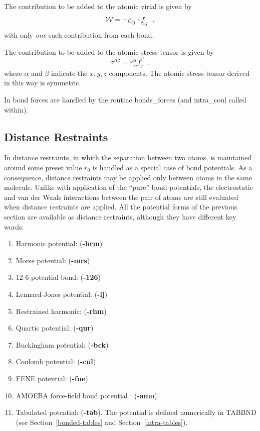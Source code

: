 The contribution to be added to the atomic virial is given by
\begin{equation}
{\cal W} = -\mbox{$\underline{r}$}_{ij} \cdot \mbox{$\underline{f}$}_{j}~~,
\end{equation}
with only {\em one} such contribution from each bond.

The contribution to be added to the atomic stress
tensor is given by
\begin{equation}
\sigma^{\alpha \beta} = r_{ij}^{\alpha} f_{j}^{\beta}~~, \label{bonds}
\end{equation}
where $\alpha$ and $\beta$ indicate the $x,y,z$ components.  The
atomic stress tensor derived in this way is
symmetric.

In \D bond forces are handled by the routine {\sc bonds\_forces}
(and {\sc intra\_coul} called within).

\subsection{Distance Restraints}

In \D distance restraints, in which the separation between two
atoms, is maintained around some preset value $r_0$ is handled as
a special case of bond potentials.  As a consequence, distance
restraints may be applied only between atoms in the same molecule.
Unlike with application of the ``pure'' bond
potentials, the
electrostatic and van der
Waals interactions between the pair
of atoms are still evaluated when distance restraints are applied.
All the potential forms of the previous section are available as
distance restraints, although they have
different key words:

\begin{enumerate}
\item Harmonic potential:  ({\bf -hrm})
\item Morse potential:  ({\bf -mrs})
\item 12-6 potential bond:  ({\bf -126})
\item Lennard-Jones potential:  ({\bf -lj})
\item Restrained harmonic:  ({\bf -rhm})
\item Quartic potential:  ({\bf -qur})
\item Buckingham potential:  ({\bf -bck})
\item Coulomb potential:  ({\bf -cul})
\item FENE potential:  ({\bf -fne})
\item AMOEBA force-field bond potential \cite{ponder-10a}:  ({\bf -amo})
\item Tabulated potential:  ({\bf -tab}).  The potential is defined numerically in TABBND (see Section~\ref{bonded-tables} and Section~\ref{intra-tables}).
\end{enumerate}

